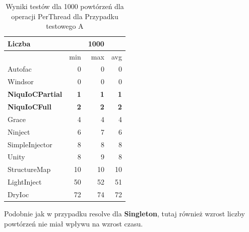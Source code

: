 \documentclass[12pt]{article}
\begin{document}
\begin{table}[H]
\captionsetup{belowskip=0pt,aboveskip=0pt}
\begin{center}
\begin{small}
	\begin{tabular}{ | l | r r r | }
    		\hline
Liczba & & 1000 & \\ \hline
 & min & max & avg \\ \hline
Autofac & 0 & 0 & 0 \\ \hline
Windsor & 0 & 0 & 0 \\ \hline
\textbf{NiquIoCPartial} & \textbf{1} & \textbf{1} & \textbf{1} \\ \hline
\textbf{NiquIoCFull} & \textbf{2} & \textbf{2} & \textbf{2} \\ \hline
Grace & 4 & 4 & 4 \\ \hline
Ninject & 6 & 7 & 6 \\ \hline
SimpleInjector & 8 & 8 & 8 \\ \hline
Unity & 8 & 9 & 8 \\ \hline
StructureMap & 10 & 10 & 10 \\ \hline
LightInject & 50 & 52 & 51 \\ \hline
DryIoc & 72 & 74 & 72 \\ \hline
  	\end{tabular}
\end{small}
\end{center}
\caption{Wyniki testów dla 1000 powtórzeń dla operacji PerThread dla Przypadku testowego A}
\label{TestCaseA_PerThread1000}
\end{table}
Podobnie jak w przypadku resolve dla \textbf{Singleton}, tutaj również wzrost liczby powtórzeń nie miał wpływu na wzrost czasu.
\end{document}
